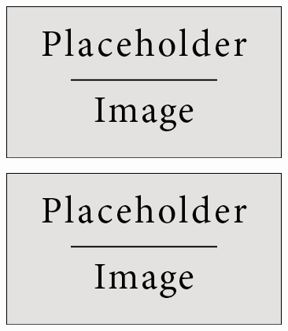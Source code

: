 \documentclass[landscape,a0paper,fontscale=0.285]{baposter} %
\begin{document}
\begin{poster}
{\begin{multicols}{2}
\begin{center}
\end{center}


\end{multicols}

\begin{multicols}{2}
\vspace{1em}



\begin{center}
    
\includegraphics[width=0.55\linewidth]{placeholder.jpg}

\includegraphics[width=0.55\linewidth]{placeholder.jpg}

\end{center}



\end{multicols}}
\end{poster}
\end{document}
